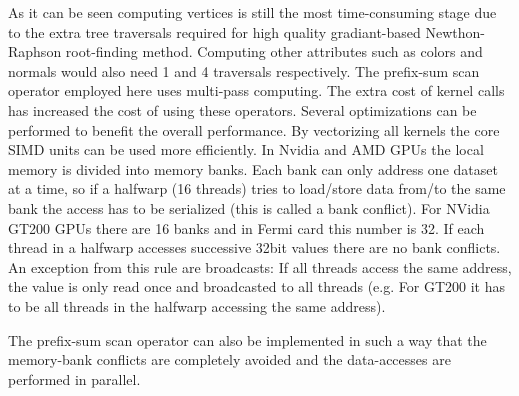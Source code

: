 As it can be seen computing vertices is still the most time-consuming stage due to the extra tree traversals required for high quality 
gradiant-based Newthon-Raphson root-finding method. Computing other attributes such as colors and normals would also need 1 and 4 
traversals respectively. The prefix-sum scan operator employed here uses multi-pass computing. The extra cost of kernel calls has
increased the cost of using these operators. Several optimizations can be performed to benefit the overall performance. By 
vectorizing all kernels the core SIMD units can be used more efficiently. 
In Nvidia and AMD GPUs the local memory is divided into memory banks. Each bank can only address one dataset at a time, so if a halfwarp (16 threads)
tries to load/store data from/to the same bank the access has to be serialized (this is called a bank conflict). 
For NVidia GT200 GPUs there are 16 banks and in Fermi card this number is 32. If each thread in a halfwarp accesses successive 32bit values
there are no bank conflicts. An exception from this rule are broadcasts: If all threads access the same address, the value is only read once and
broadcasted to all threads (e.g. For GT200 it has to be all threads in the halfwarp accessing the same address).

The prefix-sum scan operator can also be implemented in such a way that the memory-bank conflicts are completely avoided and the data-accesses
are performed in parallel.



















